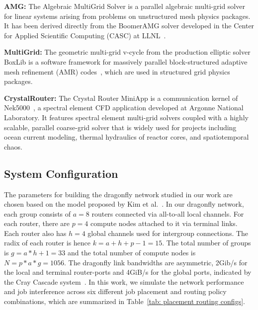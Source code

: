 \textbf{AMG:} The Algebraic MultiGrid Solver is a parallel algebraic multi-grid solver for linear systems arising from problems on unstructured mesh physics packages. It has been derived directly from the BoomerAMG solver developed in the Center for Applied Scientific Computing (CASC) at LLNL~\cite{amg}. 


\textbf{MultiGrid:} The geometric multi-grid v-cycle from the production elliptic solver BoxLib is a software framework for massively parallel block-structured adaptive mesh refinement (AMR) codes~\cite{boxlib}, which are used in structured grid physics packages. 

\textbf{CrystalRouter:} The Crystal Router MiniApp is a communication kernel of Nek5000~\cite{nek5000}, a spectral element CFD application developed at Argonne National Laboratory. It features spectral element multi-grid solvers coupled with a highly scalable, parallel coarse-grid solver that is widely used for projects including ocean current modeling, thermal hydraulics of reactor cores, and spatiotemporal chaos. 




\subsection{System Configuration}
\label{sec: simulation configuration}

The parameters for building the dragonfly network studied in our work are chosen based on the model proposed by Kim et al.~\cite{kim-micro}. 
In our dragonfly network, each group consists of $a = 8$ routers connected via all-to-all local channels. For each router, there are $p = 4$ compute nodes attached to it via terminal links. Each router also has $h = 4$ global channels used for intergroup connections. The radix of each router is hence $k = a+h+p-1 = 15$. 
The total number of groups is $g = a*h+1 = 33 $ and the total number of compute nodes is $N = p*a*g = 1056$. 
The dragonfly link bandwidths are asymmetric, 2Gib/s for the local and terminal router-ports and 4GiB/s for the global ports, indicated by the Cray Cascade system~\cite{faanes}.
In this work, we simulate the network performance and job interference across six different job placement and routing policy combinations, which are summarized in Table~\ref{tab: placement routing configs}.

